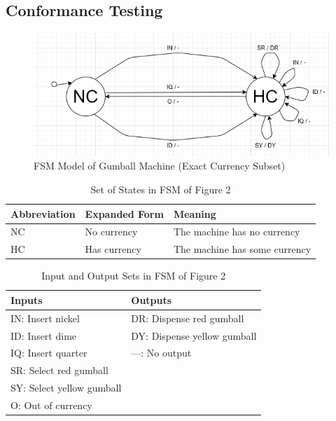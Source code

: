 \documentclass[10pt,letterpaper]{article}
\begin{document}
\subsection{Conformance Testing}
\begin{figure}[h!]
	\centerline{\includegraphics[width=\textwidth]{gumball-machine-finite-state-machine.png}}
	\caption{FSM Model of Gumball Machine (Exact Currency Subset)}
\end{figure}

\begin{table}[htb!]
\centering
\begin{tabularx}{11cm}{lll}
\toprule
Abbreviation &
    Expanded Form &
    Meaning \\ \midrule
NC &
    No currency &
    The machine has no currency \\ \midrule
HC &
    Has currency &
    The machine has some currency \\ \bottomrule
\end{tabularx}
\caption{Set of States in FSM of Figure 2}
\end{table}

\begin{table}[htb!]
\centering
\begin{tabularx}{9.25cm}{ll}
\toprule
Inputs &
    Outputs \\ \midrule
IN: Insert nickel &
    DR: Dispense red gumball \\ \midrule
ID: Insert dime &
    DY: Dispense yellow gumball \\ \midrule
IQ: Insert quarter &
    ---: No output \\ \midrule
SR: Select red gumball &
    \\ \midrule
SY: Select yellow gumball &
    \\ \midrule
O: Out of currency &
    \\ \bottomrule
\end{tabularx}
\caption{Input and Output Sets in FSM of Figure 2}
\end{table}
\end{document}
